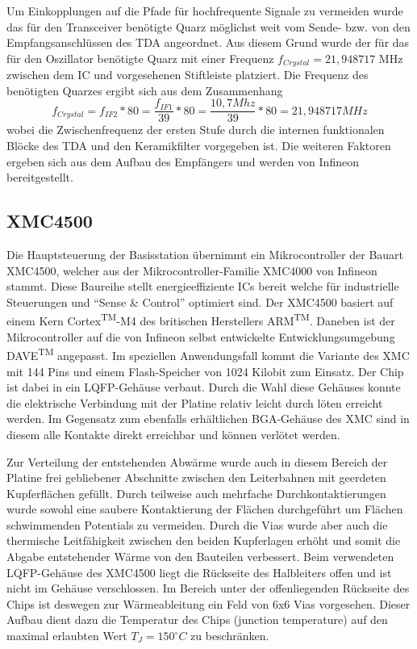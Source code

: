 Um Einkopplungen auf die Pfade für hochfrequente Signale zu vermeiden wurde das für den Transceiver benötigte Quarz möglichst weit vom Sende- bzw. von den Empfangsanschlüssen des TDA angeordnet. Aus diesem Grund wurde der für das für den Oszillator benötigte Quarz mit einer Frequenz $f_{Crystal}=21,948717$ MHz zwischen dem \ac{IC} und vorgesehenen Stiftleiste platziert.  Die Frequenz des benötigten Quarzes ergibt sich aus dem  Zusammenhang
\begin{equation}\label{eq:fsys}
f_{Crystal} = f_{IF2} * 80 = \frac{f_{IF1}}{39} * 80  = \frac{10,7 Mhz}{39} * 80 = 21,948717 MHz
\end{equation}
wobei die Zwischenfrequenz der ersten Stufe durch die internen funktionalen Blöcke des TDA und den Keramikfilter vorgegeben ist. Die weiteren Faktoren ergeben sich aus dem Aufbau des Empfängers und werden von Infineon bereitgestellt\cite{TDA-UserManual}.


\subsection{XMC4500}
Die Hauptsteuerung der Basisstation übernimmt ein Mikrocontroller der Bauart XMC4500, welcher aus der Mikrocontroller-Familie XMC4000 von Infineon stammt. Diese Baureihe stellt energieeffiziente \acp{IC} bereit welche für industrielle Steuerungen und \enquote{Sense \& Control} optimiert sind. 
Der XMC4500 basiert auf einem Kern Cortex\textsuperscript{TM}-M4 des britischen Herstellers ARM\textsuperscript{TM}. Daneben ist der Mikrocontroller auf die von Infineon selbst entwickelte Entwicklungsumgebung DAVE\textsuperscript{TM} angepasst.
Im speziellen Anwendungsfall kommt die Variante des XMC mit 144 Pins und einem Flash-Speicher von 1024 Kilobit zum Einsatz. Der Chip ist dabei in ein  \ac{LQFP}-Gehäuse verbaut. Durch die Wahl diese Gehäuses konnte die elektrische Verbindung mit der Platine relativ leicht durch löten erreicht werden. Im Gegensatz zum ebenfalls erhältlichen \ac{BGA}-Gehäuse des XMC sind in diesem alle Kontakte direkt erreichbar und können verlötet werden.


Zur Verteilung der entstehenden Abwärme wurde auch in diesem Bereich der Platine  frei gebliebener Abschnitte zwischen den Leiterbahnen mit geerdeten Kupferflächen gefüllt. Durch teilweise auch mehrfache Durchkontaktierungen wurde sowohl eine saubere Kontaktierung der Flächen durchgeführt um Flächen schwimmenden Potentials zu vermeiden. Durch die Vias wurde aber auch die thermische Leitfähigkeit zwischen den beiden Kupferlagen erhöht und somit die Abgabe entstehender Wärme von den Bauteilen verbessert. Beim verwendeten \ac{LQFP}-Gehäuse des XMC4500 liegt die Rückseite des Halbleiters offen und ist nicht im Gehäuse verschlossen. Im Bereich unter der offenliegenden Rückseite des Chips ist deswegen zur Wärmeableitung ein Feld von 6x6 Vias vorgesehen. Dieser Aufbau dient dazu die Temperatur des Chips (junction temperature) auf den maximal erlaubten Wert $T_J = 150^\circ C$ zu beschränken.%

